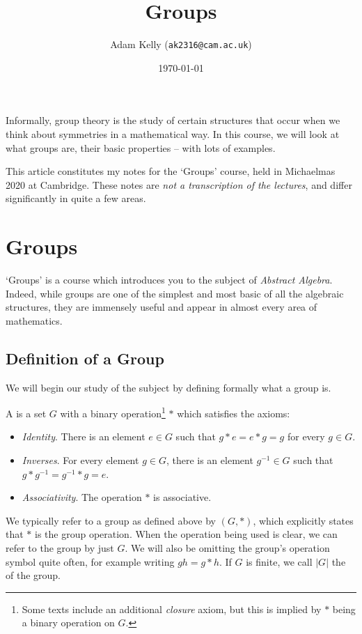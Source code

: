 \documentclass[a4paper]{scrartcl}
\title{Groups}
\author{Adam Kelly (\texttt{ak2316@cam.ac.uk})}
\date{\today}
\newcommand{\newchapter}{\section}
\newcommand{\newsection}{\subsection}
\begin{document}
\maketitle

Informally, group theory is the study of certain structures that occur when we think about symmetries in a mathematical way.  In this course, we will look at what groups are, their basic properties -- with lots of examples.

This article constitutes my notes for the `Groups' course, held in Michaelmas 2020 at Cambridge. These notes are \emph{not a transcription of the lectures}, and differ significantly in quite a few areas.

\tableofcontents



\newchapter{Groups}

`Groups' is a course which introduces you to the subject of \emph{Abstract Algebra}.
Indeed, while groups are one of the simplest and most basic of all the algebraic structures, they are immensely useful and appear in almost every area of mathematics. 

\newsection{Definition of a Group}

We will begin our study of the subject by defining formally what a group is.

\begin{definition}[Group]
	A  is a set $G$ with a binary operation\footnote{Some texts include an additional \emph{closure} axiom, but this is implied by $*$ being a binary operation on $G$.} $*$ which satisfies the axioms:
	\begin{itemize}
		\item \emph{Identity}. There is an element $e \in G$ such that $g * e = e * g = g$ for every $g \in G$.
		\item \emph{Inverses}. For every element $g \in G$, there is an element $g^{-1} \in G$ such that $g * g^{-1} = g^{-1} * g = e$.
		\item \emph{Associativity}. The operation $*$ is associative.
	\end{itemize}
\end{definition}

We typically refer to a group as defined above by $(G, *)$, which explicitly states that $*$ is the group operation. When the operation being used is clear, we can refer to the group by just $G$. We will also be omitting the group's operation symbol quite often, for example writing $gh = g * h$. If $G$ is finite, we call $|G|$ the  of the group.
\end{document}
